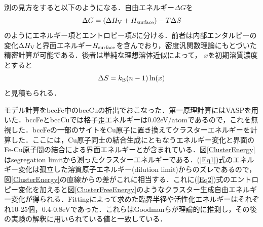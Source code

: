 \documentclass[a4j,10pt]{jarticle}
\begin{document}
別の見方をすると以下のようになる．自由エネルギー$\Delta G$を
\begin{equation}
\Delta G = \left(\Delta H_{\rm V} + H_{\rm surface} \right) - T \Delta S
\label{Eq1}
\end{equation}
のようにエネルギー項とエントロピー項$S$に分ける．前者は内部エンタルピーの変化$\Delta H_{\rm V}$と界面エネルギー$H_{\rm surface}$を含んでおり，密度汎関数理論にもとづいた精密計算が可能である．後者は単純な理想溶体近似によって， $x$を初期溶質濃度とすると
\begin{equation}
\Delta S = k_{\rm B} (n-1) \ln(x)
\label{Eq2}
\end{equation}
と見積もられる\cite{KamijoFukutomi:1983}．

モデル計算をbccFe中のbccCuの析出でおこなった．第一原理計算にはVASPを用いた．bccFeとbccCuでは格子歪エネルギーは0.02eV/atomであるので，これを無視した．bccFeの一部のサイトをCu原子に置き換えてクラスターエネルギーを計算した．ここには，Cu原子同士の結合生成にともなうエネルギー変化と界面のFe-Cu原子間の結合による界面エネルギーとが含まれている．図\ref{ClusterEnergy}はsegregation limitから測ったクラスターエネルギーである．(\ref{Eq1})式のエネルギー変化は孤立した溶質原子エネルギー(dilution limit)からのズレであるので，図\ref{ClusterEnergy}の直線からの差がこれに相当する．これに(\ref{Eq2})式のエントロピー変化を加えると図\ref{ClusterFreeEnergy}のようなクラスター生成自由エネルギー変化が得られる．Fittingによって求めた臨界半径や活性化エネルギーはそれぞれ10-25個，0.4-0.8eVであった．これらはGoodmanら\cite{Goodman:1973b}が理論的に推測し，その後の実験の解釈に用いられている値と一致している．
\end{document}
